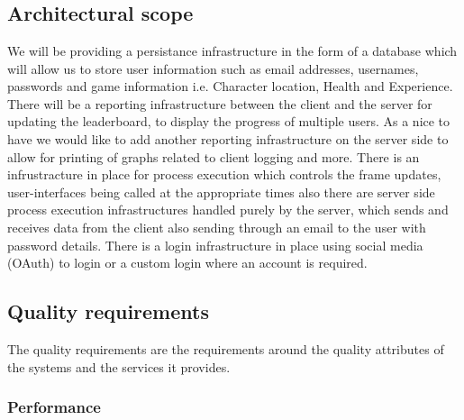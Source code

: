 \documentclass[letterpaper]{article}
\begin{document}
		\section*{\colorbox{black}{}} 
		\vspace{0.1in}
			
			\subsection*{ Architectural scope }
			\vspace{0.1in}	
			We will be providing a persistance infrastructure in the form of a database which will allow us to store user information such as email addresses, usernames, passwords and game information i.e. Character location, Health and Experience. There will be a reporting infrastructure between the client and the server for updating the leaderboard, to display the progress of multiple users. As a nice to have we would like to add another reporting infrastructure on the server side to allow for printing of graphs related to client logging and more. There is an infrustracture in place for process execution which controls the frame updates, user-interfaces being called at the appropriate times also there are server side process execution infrastructures handled purely by the server, which sends and receives data from the client also sending through an email to the user with password details. There is a login infrastructure in place using social media (OAuth) to login or a custom login where an account is required. 
				
			\vspace{0.2in}
			\subsection*{ Quality requirements }
			\vspace{0.1in}
				
				The quality requirements are the requirements around the quality attributes of the systems and the
				services it provides.
				
				\subsubsection*{Performance}
				\vspace{0.1in}
				
\end{document}
